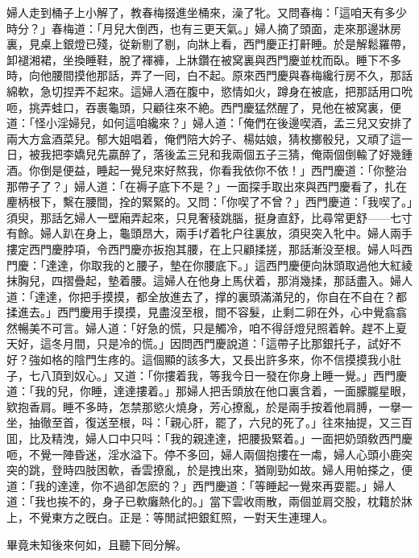 婦人走到桶子上小解了，教春梅掇進坐桶來，澡了牝。又問春梅：「這咱天有多少時分？」春梅道：「月兒大倒西，也有三更天氣。」婦人摘了頭面，走來那邊牀房裏，見桌上銀燈已殘，従新剔了剔，向牀上看，西門慶正打鼾睡。於是解鬆羅帶，卸褪湘裙，坐換睡鞋，脫了褌褲，上牀鑽在被窝裏與西門慶並枕而臥。睡下不多時，向他腰間摸他那話，弄了一囘，白不起。原來西門慶與春梅纔行房不久，那話綿軟，急切捏弄不起來。這婦人酒在腹中，慾情如火，蹲身在被底，把那話用口吮咂，挑弄蛙口，吞裹龜頭，只顧往來不絶。西門慶猛然醒了，見他在被窝裏，便道：「怪小淫婦兒，如何這咱纔來？」婦人道：「俺們在後邊喫酒，孟三兒又安排了兩大方盒酒菜兒。郁大姐唱着，俺們陪大妗子、楊姑娘，猜枚擲骰兒，又頑了這一日，被我把李嬌兒先贏醉了，落後孟三兒和我兩個五子三猜，俺兩個倒輸了好幾鍾酒。你倒是便益，睡起一覺兒來好熬我，你看我依你不依！」西門慶道：「你整治那帶子了？」婦人道：「在褥子底下不是？」一面探手取出來與西門慶看了，扎在麈柄根下，繫在腰間，拴的緊緊的。又問：「你喫了不曾？」西門慶道：「我喫了。」須臾，那話乞婦人一壁廂弄起來，只見奢稜跳腦，挺身直舒，比尋常更舒——七寸有餘。婦人趴在身上，龜頭昂大，兩手げ着牝户往裏放，須臾突入牝中。婦人兩手摟定西門慶脖項，令西門慶亦扳抱其腰，在上只顧揉搓，那話漸没至根。婦人呌西門慶：「達達，你取我的と腰子，墊在你腰底下。」這西門慶便向牀頭取過他大紅綾抹胸兒，四摺疊起，墊着腰。這婦人在他身上馬伏着，那消幾揉，那話盡入。婦人道：「達達，你把手摸摸，都全放進去了，撑的裏頭滿滿兒的，你自在不自在？都揉進去。」西門慶用手摸摸，見盡沒至根，間不容髮，止剩二卵在外，心中覺翕翕然暢美不可言。婦人道：「好急的慌，只是觸冷，咱不得㧱燈兒照着幹。趕不上夏天好，這冬月間，只是冷的慌。」因問西門慶說道：「這帶子比那銀托子，試好不好？強如格的陰門生疼的。這個顯的該多大，又長出許多來，你不信摸摸我小肚子，七八頂到奴心。」又道：「你摟着我，等我今日一發在你身上睡一覺。」西門慶道：「我的兒，你睡，達達摟着。」那婦人把舌頭放在他口裏含着，一面朦朧星眼，欵抱香肩。睡不多時，怎禁那慾火燒身，芳心撩亂，於是兩手按着他肩膊，一擧一坐，抽徹至首，復送至根，呌：「親心肝，罷了，六兒的死了。」往來抽提，又三百囬，比及精洩，婦人口中只呌：「我的親達達，把腰扱緊着。」一面把奶頭敎西門慶咂，不覺一陣昏迷，淫水溢下。停不多回，婦人兩個抱摟在一䖏，婦人心頭小鹿突突的跳，登時四肢困軟，香雲撩亂，於是拽出來，猶剛勁如故。婦人用帕搽之，便道：「我的達達，你不過卻怎麽的？」西門慶道：「等睡起一覺來再耍罷。」婦人道：「我也挨不的，身子已軟癱熱化的。」當下雲收雨散，兩個並肩交股，枕籍於牀上，不覺東方之旣白。正是：等閒試把銀釭照，一對天生連理人。

畢竟未知後來何如，且聽下囘分解。

